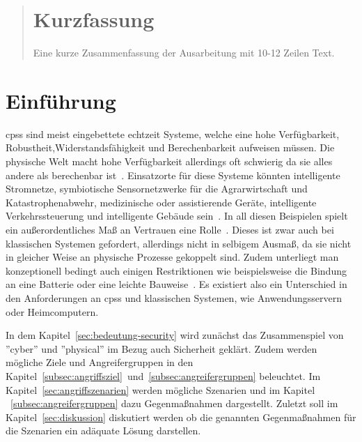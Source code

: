 \documentclass[final,bibliography=totocnumbered]{include/sikseminar}
\begin{document}
\makeTitle

\makeAuthor
\date{Datum des Vortrags \todo}
\subject{Seminar Cyber-Physical Systems}

\maketitle

\begin{abstract}
\section*{Kurzfassung}
Eine kurze Zusammenfassung der Ausarbeitung mit 10-12 Zeilen Text.
\end{abstract}
\thispagestyle{empty}
\newpage
\tableofcontents
\newpage

\section{Einführung}\label{sec:intro}
\glspl{cps} sind meist eingebettete echtzeit Systeme, welche eine hohe Verfügbarkeit, Robustheit,Widerstandsfähigkeit und Berechenbarkeit aufweisen müssen.
Die physische Welt macht hohe Verfügbarkeit allerdings oft schwierig da sie alles andere als berechenbar ist~\cite{Lee08,SGL+08}.
Einsatzorte für diese Systeme könnten intelligente Stromnetze, symbiotische Sensornetzwerke für die Agrarwirtschaft und Katastrophenabwehr, medizinische oder assistierende Geräte, intelligente Verkehrssteuerung und intelligente Gebäude sein~\cite{RLS+10}.
In all diesen Beispielen spielt ein außerordentliches Maß an Vertrauen eine Rolle~\cite{SGL+08}.
Dieses ist zwar auch bei klassischen Systemen gefordert, allerdings nicht in selbigem Ausmaß, da sie nicht in gleicher Weise an physische Prozesse gekoppelt sind.
Zudem unterliegt man konzeptionell bedingt auch einigen Restriktionen wie beispielsweise die Bindung an eine Batterie oder eine leichte Bauweise~\cite{YWY+17}.
Es existiert also ein Unterschied in den Anforderungen an \glspl{cps} und klassischen Systemen, wie Anwendungsservern oder Heimcomputern.

In dem Kapitel~\ref{sec:bedeutung-security} wird zunächst das Zusammenspiel von ''cyber'' und ''physical'' im Bezug auch Sicherheit geklärt.
Zudem werden mögliche Ziele und Angreifergruppen in den Kapitel~\ref{subsec:angriffsziel}~und~\ref{subsec:angreifergruppen} beleuchtet.
Im Kapitel~\ref{sec:angriffszenarien} werden mögliche Szenarien und im Kapitel ~\ref{subsec:angreifergruppen} dazu Gegenmaßnahmen dargestellt.
Zuletzt soll im Kapitel~\ref{sec:diskussion} diskutiert werden ob die genannten Gegenmaßnahmen  für die Szenarien ein adäquate Lösung darstellen.
\end{document}

